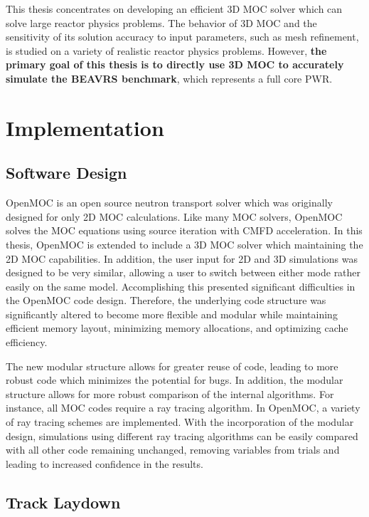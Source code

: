 \documentclass[12pt,twoside]{mitthesis-exec}
\begin{document}
This thesis concentrates on developing an efficient 3D MOC solver which can solve large reactor physics problems. The behavior of 3D MOC and the sensitivity of its solution accuracy to input parameters, such as mesh refinement, is studied on a variety of realistic reactor physics problems. However, \textbf{the primary goal of this thesis is to directly use 3D MOC to accurately simulate the BEAVRS benchmark}, which represents a full core PWR.


\section*{Implementation}

\subsection*{Software Design}

OpenMOC is an open source neutron transport solver which was originally designed for only 2D MOC calculations. Like many MOC solvers, OpenMOC solves the MOC equations using source iteration with CMFD acceleration. In this thesis, OpenMOC is extended to include a 3D MOC solver which maintaining the 2D MOC capabilities. In addition, the user input for 2D and 3D simulations was designed to be very similar, allowing a user to switch between either mode rather easily on the same model. Accomplishing this presented significant difficulties in the OpenMOC code design. Therefore, the underlying code structure was significantly altered to become more flexible and modular while maintaining efficient memory layout, minimizing memory allocations, and optimizing cache efficiency. 

The new modular structure allows for greater reuse of code, leading to more robust code which minimizes the potential for bugs. In addition, the modular structure allows for more robust comparison of the internal algorithms. For instance, all MOC codes require a ray tracing algorithm. In OpenMOC, a variety of ray tracing schemes are implemented. With the incorporation of the modular design, simulations using different ray tracing algorithms can be easily compared with all other code remaining unchanged, removing variables from trials and leading to increased confidence in the results. 

\subsection*{Track Laydown}
\end{document}
